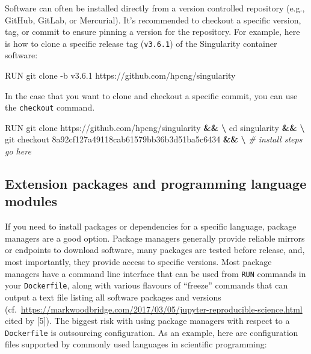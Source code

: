\documentclass[10pt,letterpaper]{article}
\newenvironment{Shaded}{\begin{snugshade}}{\end{snugshade}}
\newcommand{\BuiltInTok}[1]{#1}
\newcommand{\CommentTok}[1]{\textcolor[rgb]{0.56,0.35,0.01}{\textit{#1}}}
\newcommand{\ExtensionTok}[1]{#1}
\newcommand{\FunctionTok}[1]{\textcolor[rgb]{0.00,0.00,0.00}{#1}}
\newcommand{\KeywordTok}[1]{\textcolor[rgb]{0.13,0.29,0.53}{\textbf{#1}}}
\newcommand{\NormalTok}[1]{#1}
\begin{document}
Software can often be installed directly from a version controlled
repository (e.g., GitHub, GitLab, or Mercurial). It's recommended to
checkout a specific version, tag, or commit to ensure pinning a version
for the repository. For example, here is how to clone a specific release
tag (\texttt{v3.6.1}) of the Singularity container software:

\begin{Shaded}
\begin{Highlighting}[]
\ExtensionTok{RUN}\NormalTok{ git clone -b v3.6.1 https://github.com/hpcng/singularity}
\end{Highlighting}
\end{Shaded}

In the case that you want to clone and checkout a specific commit, you
can use the \texttt{checkout} command.

\begin{Shaded}
\begin{Highlighting}[]
\ExtensionTok{RUN}\NormalTok{ git clone https://github.com/hpcng/singularity }\KeywordTok{&&} \KeywordTok{\textbackslash{}}
    \BuiltInTok{cd}\NormalTok{ singularity }\KeywordTok{&&} \KeywordTok{\textbackslash{}}
    \FunctionTok{git}\NormalTok{ checkout 8a92cf127a49118cab61579bb36b3d51ba5c6434 }\KeywordTok{&&} \KeywordTok{\textbackslash{}}
    \CommentTok{# install steps go here}
\end{Highlighting}
\end{Shaded}

\hypertarget{extension-packages-and-programming-language-modules}{%
\subsection{Extension packages and programming language
modules}\label{extension-packages-and-programming-language-modules}}

If you need to install packages or dependencies for a specific language,
package managers are a good option. Package managers generally provide
reliable mirrors or endpoints to download software, many packages are
tested before release, and, most importantly, they provide access to
specific versions. Most package managers have a command line interface
that can be used from \texttt{RUN} commands in your \texttt{Dockerfile},
along with various flavours of ``freeze'' commands that can output a
text file listing all software packages and versions
(cf.~\url{https://markwoodbridge.com/2017/03/05/jupyter-reproducible-science.html}
cited by {[}5{]}). The biggest risk with using package managers with
respect to a \texttt{Dockerfile} is outsourcing configuration. As an
example, here are configuration files supported by commonly used
languages in scientific programming:
\end{document}
